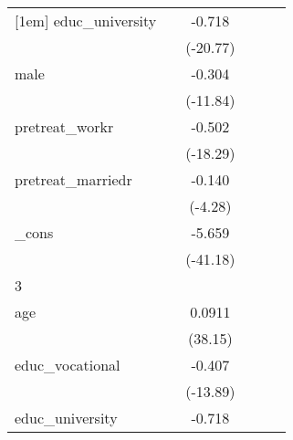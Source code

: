 {\begin{tabular}{l*{5}{c}}
[1em]
educ\_university&                     &      -0.718\sym{***}&                     &                     &                     \\
            &                     &    (-20.77)         &                     &                     &                     \\
[1em]
male        &                     &      -0.304\sym{***}&                     &                     &                     \\
            &                     &    (-11.84)         &                     &                     &                     \\
[1em]
pretreat\_workr&                     &      -0.502\sym{***}&                     &                     &                     \\
            &                     &    (-18.29)         &                     &                     &                     \\
[1em]
pretreat\_marriedr&                     &      -0.140\sym{***}&                     &                     &                     \\
            &                     &     (-4.28)         &                     &                     &                     \\
[1em]
\_cons      &                     &      -5.659\sym{***}&                     &                     &                     \\
            &                     &    (-41.18)         &                     &                     &                     \\
\hline
3           &                     &                     &                     &                     &                     \\
age         &                     &      0.0911\sym{***}&                     &                     &                     \\
            &                     &     (38.15)         &                     &                     &                     \\
[1em]
educ\_vocational&                     &      -0.407\sym{***}&                     &                     &                     \\
            &                     &    (-13.89)         &                     &                     &                     \\
[1em]
educ\_university&                     &      -0.718\sym{***}&                     &                     &                     \\

\end{tabular}}
